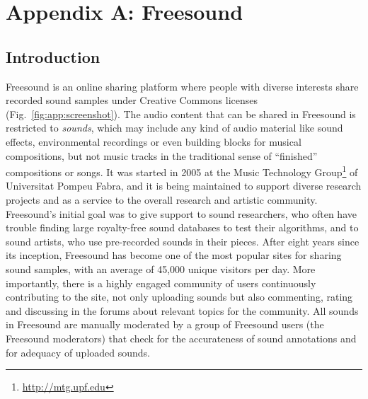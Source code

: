 
\chapter{Appendix A: Freesound}
\label{appendix:Freesound}

\section{Introduction}
\label{appendix:Freesound_intro}

Freesound is an online sharing platform where people with diverse interests share recorded sound samples under Creative Commons licenses (Fig.~\ref{fig:app:screenshot}). 
The audio content that can be shared in Freesound is restricted to \emph{sounds}, which may include any kind of audio material like sound effects, environmental recordings or even building blocks for musical compositions, but not music tracks in the traditional sense of ``finished'' compositions or songs.
It was started in 2005 at the Music Technology Group\footnote{\url{http://mtg.upf.edu}} of Universitat Pompeu Fabra, and it is being maintained to support diverse research projects and as a service to the overall research and artistic community. 
Freesound's initial goal was to give support to sound researchers, who often have trouble finding large royalty-free sound databases to test their algorithms, and to sound artists, who use pre-recorded sounds in their pieces. After eight years since its inception, Freesound has become one of the most popular sites for sharing sound samples, with an average of 45,000 unique visitors per day.
More importantly, there is a highly engaged community of users continuously contributing to the site, not only uploading sounds but also commenting, rating and discussing in the forums about relevant topics for the community.
All sounds in Freesound are manually moderated by a group of Freesound users (the Freesound moderators) that check for the accurateness of sound annotations and for adequacy of uploaded sounds.

